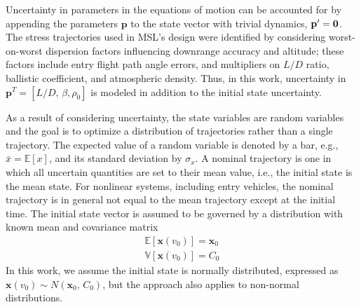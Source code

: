 \documentclass[journal ]{new-aiaa}
\newcommand{\state}{\ensuremath{\mathbf{x}}}
\newcommand{\param}{\ensuremath{\mathbf{p}}}
\newcommand{\E}[1]{\mathbb{E}\left[#1\right]}
\newcommand{\V}[1]{\mathbb{V}[#1]}
\newcommand{\cov}{C}
\begin{document}
Uncertainty in parameters in the equations of motion can be accounted for by appending the parameters $\param$ to the state vector with trivial dynamics, $\param'=\bf0$. The stress trajectories used in MSL's design were identified by considering worst-on-worst dispersion factors influencing downrange accuracy and altitude\cite{MSL_EDL2}; these factors include entry flight path angle errors, and multipliers on $L/D$ ratio, ballistic coefficient, and atmospheric density. Thus, in this work, uncertainty in $\param^T = [L/D,\,\beta,\rho_0]$ is modeled in addition to the initial state uncertainty. 

As a result of considering uncertainty, the state variables are random variables and the goal is to optimize a distribution of trajectories rather than a single trajectory. The expected value of a random variable is denoted by a bar, e.g., $\bar{x}=\E{x}$, and its standard deviation by $\sigma_{x}$. A nominal trajectory is one in which all uncertain quantities are set to their mean value, i.e., the initial state is the mean state. For nonlinear systems, including entry vehicles, the nominal trajectory is in general not equal to the mean trajectory except at the initial time. The initial state vector is assumed to be governed by a distribution with known mean and covariance matrix
\begin{align}
	\E{\state(v_0)} = \state_0 \label{eq_ic_mean}\\ 
	\V{\state(v_0)} = \cov_0 \label{eq_ic_cov}
\end{align}
In this work, we assume the initial state is normally distributed, expressed as $\state(v_0)\sim N(\state_0,\,\cov_0)$, but the approach also applies to non-normal distributions. 
\end{document}
